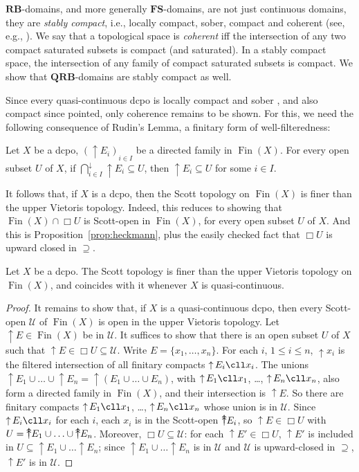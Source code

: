 \documentclass{LMCS}
\newcommand\upc{\mathop{\uparrow}\nolimits}
\newcommand\uuarrow{\rlap{$\uparrow$}\raise.5ex\hbox{$\uparrow$}}\newcommand\ddarrow{\rlap{$\downarrow$}\raise.5ex\hbox{$\downarrow$}}\newcommand\Fin{\mathop{\text{Fin}}}
\newcommand\QRB{\mathbf{QRB}}
\newcommand\RB{\mathbf{RB}}
\newcommand\FS{\mathbf{FS}}
\begin{document}
$\RB$-domains, and more generally $\FS$-domains, are not just
continuous domains, they are {\em stably compact\/}, i.e., locally
compact, sober, compact and coherent (see, e.g.,
\cite[Theorem~4.2.18]{AJ:domains}).  We say that a topological space
is {\em coherent\/} iff the intersection of any two compact saturated
subsets is compact (and saturated).  In a stably compact space, the
intersection of any family of compact saturated subsets is compact.
We show that $\QRB$-domains are stably compact as well.

Since every quasi-continuous dcpo is locally compact and sober
\cite[Proposition~III-3.7]{GHKLMS:contlatt}, and also compact since
pointed, only coherence remains to be shown.  For this, we need the
following consequence of Rudin's Lemma, a finitary form of
well-filteredness:
\begin{prop}
  \label{prop:heckmann}
  Let $X$ be a dcpo, ${(\upc E_i)}_{i \in I}$ be a directed family in
  $\Fin (X)$.  For every open subset $U$ of $X$, if $\bigcap_{i \in
    I}^\downarrow \upc E_i \subseteq U$, then $\upc E_i \subseteq U$
  for some $i \in I$.
\end{prop}

It follows that, if $X$ is a dcpo, then the Scott topology on $\Fin
(X)$ is finer than the upper Vietoris topology.  Indeed, this reduces
to showing that $\Fin (X) \cap \Box U$ is Scott-open in $\Fin (X)$,
for every open subset $U$ of $X$.  And this is
Proposition~\ref{prop:heckmann}, plus the easily checked fact that
$\Box U$ is upward closed in $\supseteq$.
\begin{cor} \label{corl:BoxU}
  Let $X$ be a dcpo.  The Scott topology is finer than the upper
  Vietoris topology on $\Fin (X)$, and coincides with it whenever $X$
  is quasi-continuous.
\end{cor}
\begin{proof}
  It remains to show that, if $X$ is a quasi-continuous dcpo, then
  every Scott-open $\mathcal U$ of $\Fin (X)$ is open in the upper
  Vietoris topology.  Let $\upc E \in \Fin (X)$ be in $\mathcal U$.
  It suffices to show that there is an open subset $U$ of $X$ such
  that $\upc E \in \Box U \subseteq \mathcal U$.  Write $E = \{x_1,
  \ldots, x_n\}$.  For each $i$, $1\leq i\leq n$, $\upc x_i$ is the
  filtered intersection of all finitary compacts $\upc E_i \cll x_i$.
  The unions $\upc E_1 \cup \ldots \cup \upc E_n = \upc (E_1 \cup
  \ldots \cup E_n)$, with $\upc E_1 \cll x_1$, \ldots, $\upc E_n \cll
  x_n$, also form a directed family in $\Fin (X)$, and their
  intersection is $\upc E$.  So there are finitary compacts $\upc E_1
  \cll x_1$, \ldots, $\upc E_n \cll x_n$ whose union is in $\mathcal
  U$.  Since $\upc E_i \cll x_i$ for each $i$, each $x_i$ is in the
  Scott-open $\uuarrow E_i$, so $\upc E \in \Box U$ with $U = \uuarrow
  E_1 \cup \ldots \cup \uuarrow E_n$.  Moreover, $\Box U \subseteq
  \mathcal U$: for each $\upc E' \in \Box U$, $\upc E'$ is included in
  $U \subseteq \upc E_1 \cup \ldots \upc E_n$; since $\upc E_1 \cup
  \ldots \upc E_n$ is in $\mathcal U$ and $\mathcal U$ is
  upward-closed in $\supseteq$, $\upc E'$ is in $\mathcal U$.  \end{proof}
\end{document}
